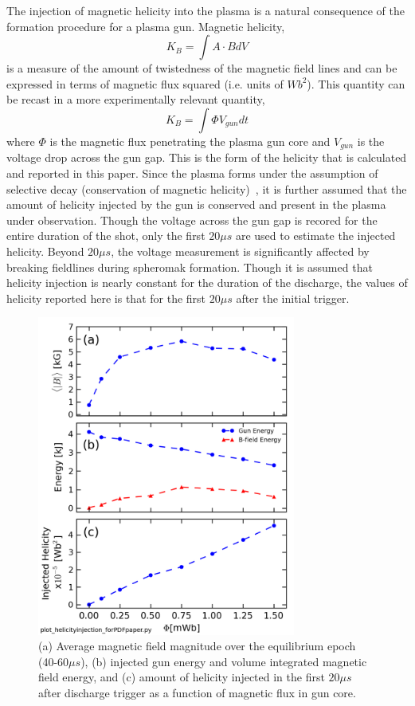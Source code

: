 \documentclass[aip,prl,amsmath,amssymb,reprint,superscriptaddress]{revtex4-1} %
\begin{document}
The injection of magnetic helicity into the plasma is a natural consequence of the formation procedure for a plasma gun. Magnetic helicity,
%
\begin{equation}
K_{B} = \int A \cdot B dV
\label{eq:helicity_th}
\end{equation}
%
is a measure of the amount of twistedness of the magnetic field lines and can be expressed in terms of magnetic flux squared (i.e. units of $Wb^{2}$). This quantity can be recast in a more experimentally relevant quantity, 
%
\begin{equation}
K_{B} = \int \Phi V_{gun} dt
\label{eq:helicity_exp}
\end{equation}
%
where $\Phi$ is the magnetic flux penetrating the plasma gun core and $V_{gun}$ is the voltage drop across the gun gap. This is the form of the helicity that is calculated and reported in this paper. Since the plasma forms under the assumption of selective decay (conservation of magnetic helicity)~\cite{Gray13}, it is further assumed that the amount of helicity injected by the gun is conserved and present in the plasma under observation. Though the voltage across the gun gap is recored for the entire duration of the shot, only the first $20 \mu s$ are used to estimate the injected helicity. Beyond $20 \mu s$, the voltage measurement is significantly affected by breaking fieldlines during spheromak formation. Though it is assumed that helicity injection is nearly constant for the duration of the discharge, the values of helicity reported here is that for the first $20 \mu s$ after the initial trigger.

\begin{figure}[!htbp]
\centerline{
\includegraphics[width=8.5cm]{helicity_scaling.png}}
\caption{\label{fig:helicity_scaling} (a) Average magnetic field magnitude over the equilibrium epoch (40-60$\mu s$), (b) injected gun energy and volume integrated magnetic field energy, and (c) amount of helicity injected in the first $20 \mu s$ after discharge trigger as a function of magnetic flux in gun core.}
\end{figure}
\end{document}

